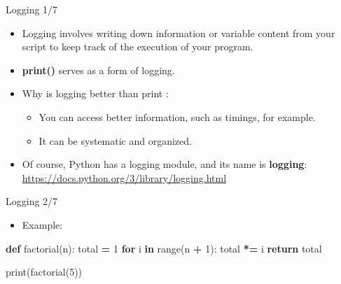 \documentclass[
  8pt,
  ignorenonframetext,
]{beamer}
\newenvironment{Shaded}{\begin{snugshade}}{\end{snugshade}}
\newcommand{\BuiltInTok}[1]{#1}
\newcommand{\ControlFlowTok}[1]{\textcolor[rgb]{0.13,0.29,0.53}{\textbf{#1}}}
\newcommand{\DecValTok}[1]{\textcolor[rgb]{0.00,0.00,0.81}{#1}}
\newcommand{\KeywordTok}[1]{\textcolor[rgb]{0.13,0.29,0.53}{\textbf{#1}}}
\newcommand{\NormalTok}[1]{#1}
\newcommand{\OperatorTok}[1]{\textcolor[rgb]{0.81,0.36,0.00}{\textbf{#1}}}
\providecommand{\tightlist}{%
  \setlength{\itemsep}{0pt}\setlength{\parskip}{0pt}}
\begin{document}
\begin{frame}{Logging 1/7}
\protect\hypertarget{logging-17}{}
\begin{itemize}
\item
  Logging involves writing down information or variable content from
  your script to keep track of the execution of your program.
\item
  \textbf{print()} serves as a form of logging.
\item
  Why is logging better than print :

  \begin{itemize}
  \tightlist
  \item
    You can access better information, such as timings, for example.
  \item
    It can be systematic and organized.
  \end{itemize}
\item
  Of course, Python has a logging module, and its name is
  \textbf{logging}: \url{https://docs.python.org/3/library/logging.html}
\end{itemize}
\end{frame}

\begin{frame}[fragile]{Logging 2/7}
\protect\hypertarget{logging-27}{}
\begin{itemize}
\tightlist
\item
  Example:
\end{itemize}

\begin{Shaded}
\begin{Highlighting}[]
\KeywordTok{def}\NormalTok{ factorial(n):}
\NormalTok{    total }\OperatorTok{=} \DecValTok{1}
    \ControlFlowTok{for}\NormalTok{ i }\KeywordTok{in} \BuiltInTok{range}\NormalTok{(n }\OperatorTok{+} \DecValTok{1}\NormalTok{):}
\NormalTok{        total }\OperatorTok{*=}\NormalTok{ i}
    \ControlFlowTok{return}\NormalTok{ total}

\BuiltInTok{print}\NormalTok{(factorial(}\DecValTok{5}\NormalTok{))}
\end{Highlighting}
\end{Shaded}
\end{frame}
\end{document}
